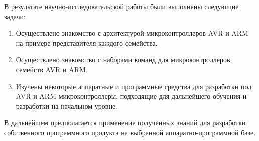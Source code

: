 \documentclass[12pt, oneside]{altsu-report}
\begin{document}
В результате научно-исследовательской работы были выполнены следующие задачи:

\begin{enumerate}
    \item Осуществлено знакомство с архитектурой микроконтроллеров AVR и ARM на примере представителя каждого семейства.
    
    \item Осуществлено знакомство с наборами команд для микроконтроллеров семейств AVR и ARM.
    
    \item Изучены некоторые аппаратные и программные средства для разработки под AVR и ARM микроконтроллеры, подходящие для дальнейшего обучения и разработки на начальном уровне.
\end{enumerate}

В дальнейшем предполагается применение полученных знаний для разработки собственного программного продукта на выбранной аппаратно-программной базе.

\newpage
{}
\printbibliography[title={Список использованной литературы}]
\end{document}
